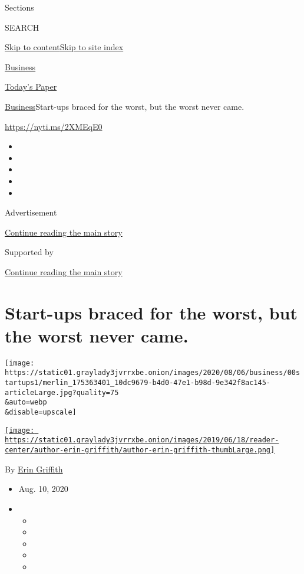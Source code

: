 Sections

SEARCH

\protect\hyperlink{site-content}{Skip to
content}\protect\hyperlink{site-index}{Skip to site index}

\href{https://www.nytimes3xbfgragh.onion/section/business}{Business}

\href{https://myaccount.nytimes3xbfgragh.onion/auth/login?response_type=cookie\&client_id=vi}{}

\href{https://www.nytimes3xbfgragh.onion/section/todayspaper}{Today's
Paper}

\href{/section/business}{Business}\textbar{}Start-ups braced for the
worst, but the worst never came.

\url{https://nyti.ms/2XMEqE0}

\begin{itemize}
\item
\item
\item
\item
\item
\end{itemize}

Advertisement

\protect\hyperlink{after-top}{Continue reading the main story}

Supported by

\protect\hyperlink{after-sponsor}{Continue reading the main story}

\hypertarget{start-ups-braced-for-the-worst-but-the-worst-never-came}{%
\section{Start-ups braced for the worst, but the worst never
came.}\label{start-ups-braced-for-the-worst-but-the-worst-never-came}}

\texttt{[image: https://static01.graylady3jvrrxbe.onion/images/2020/08/06/business/00startups1/merlin\_175363401\_10dc9679-b4d0-47e1-b98d-9e342f8ac145-articleLarge.jpg?quality=75\\\&auto=webp\\\&disable=upscale]}

\href{https://www.nytimes3xbfgragh.onion/by/erin-griffith}{\texttt{[image: https://static01.graylady3jvrrxbe.onion/images/2019/06/18/reader-center/author-erin-griffith/author-erin-griffith-thumbLarge.png]}}

By \href{https://www.nytimes3xbfgragh.onion/by/erin-griffith}{Erin
Griffith}

\begin{itemize}
\item
  Aug. 10, 2020
\item
  \begin{itemize}
  \item
  \item
  \item
  \item
  \item
  \end{itemize}
\end{itemize}

